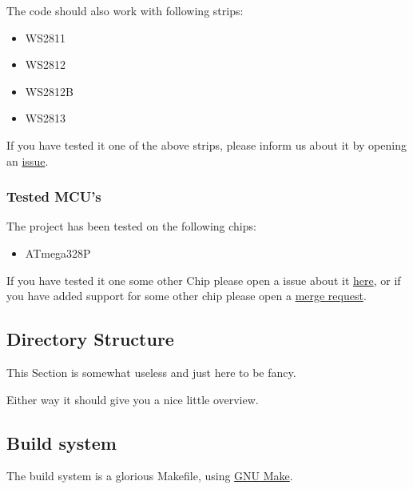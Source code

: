 \bigskip
The code should also work with following strips:

\begin{itemize}
    \item WS2811
    \item WS2812
    \item WS2812B
    \item WS2813
\end{itemize}

If you have tested it one of the above strips, please inform us about it by opening an \href{https://git.chaostreffbern.ch/molniya-gang/owoled/-/issues}{issue}.

\subsubsection{Tested MCU's}
The project has been tested on the following chips:
\begin{itemize}
    \item{ATmega328P}
\end{itemize}

If you have tested it one some other Chip please open a issue about it \href{https://git.chaostreffbern.ch/molniya-gang/owoled/-/issues}{here}, or if you have added support for some other chip please open a \href{https://git.chaostreffbern.ch/molniya-gang/owoled/-/merge_requests}{merge request}.

\subsection{Directory Structure}
This Section is somewhat useless and just here to be fancy.
\bigskip

Either way it should give you a nice little overview.
\bigskip


\subsection{Build system}
The build system is a glorious Makefile, using \href{https://www.gnu.org/software/make}{GNU Make}.
